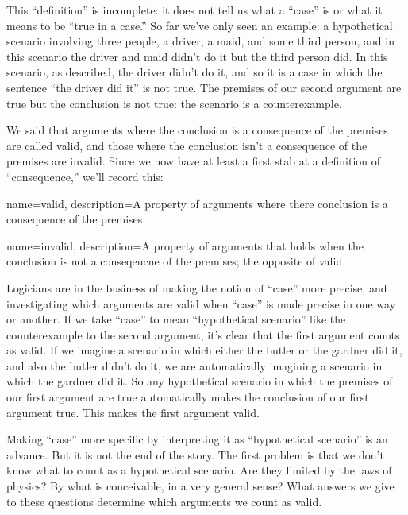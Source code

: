 This ``definition'' is incomplete: it does not tell us what a ``case'' is or what it means to be ``true in a case.''  So far we've only seen an example: a hypothetical scenario involving three people, a driver, a maid, and some third person, and in this scenario the driver and maid didn't do it but the third person did. In this scenario, as described, the driver didn't do it, and so it is a case in which the sentence ``the driver did it'' is not true. The premises of our second argument are true but the conclusion is not true: the scenario is a counterexample.

We said that arguments where the conclusion is a consequence of the premises are called valid, and those where the conclusion isn't a consequence of the premises are invalid. Since we now have at least a first stab at a definition of ``consequence,'' we'll record this: 



{
name=valid,
description={A property of arguments where there conclusion is a consequence of the premises}
}

{
name=invalid,
description={A property of arguments that holds when the conclusion is not a conseqeucne of the premises; the opposite of \gls{valid}}
}

Logicians are in the business of making the notion of ``case'' more precise, and investigating which arguments are valid when ``case'' is made precise in one way or another. If we take ``case'' to mean ``hypothetical scenario'' like the counterexample to the second argument, it's clear that the first argument counts as valid. If we imagine a scenario in which either the butler or the gardner did it, and also the butler didn't do it, we are automatically imagining a scenario in which the gardner did it. So any hypothetical scenario in which the premises of our first argument are true automatically makes the conclusion of our first argument true. This makes the first argument valid. 

Making ``case'' more specific by interpreting it as ``hypothetical scenario'' is an advance. But it is not the end of the story.  The first problem is that we don't know what to count as a hypothetical scenario. Are they limited by the laws of physics? By what is conceivable, in a very general sense?  What answers we give to these questions determine which arguments we count as valid.

